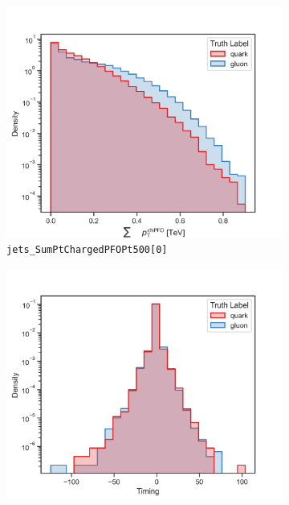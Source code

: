 \begin{figure}[!htb]
	\centering
	\begin{subfigure}[t]{0.48\textwidth}
		\includegraphics[width=1\textwidth]{src/plots/distributions/highlevel/jets_SumPtChargedPFOPt500[0].png}
		\caption{\texttt{jets\_SumPtChargedPFOPt500[0]}}
		\label{fig:highlevel_18}
	\end{subfigure}
	\begin{subfigure}[t]{0.48\textwidth}
		\includegraphics[width=1\textwidth]{src/plots/distributions/highlevel/jets_Timing.png}

\end{subfigure}
\end{figure}
